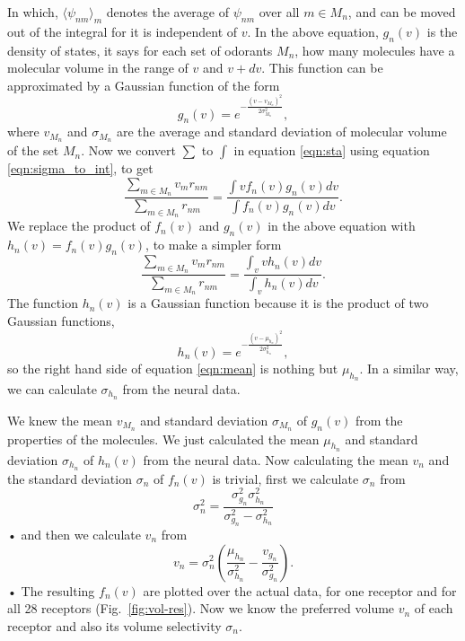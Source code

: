 \documentclass[11pt]{paper} %
\begin{document}
In which, 
$\langle \psi_{nm} \rangle_m$ denotes the average of $\psi_{nm}$ over all $m \in M_n$, 
and can be moved out of the integral for it is independent of $v$.
In the above equation, 
$g_n(v)$ is the density of states, it says for each set of odorants $M_n$, how many molecules have a molecular volume in the range of $v$ and $v+dv$.
This function can be approximated by a Gaussian function of the form 
\begin{equation}
	g_n(v) = e^{-\frac{(v- v_{M_n})^2}{2\sigma_{M_n}^2}},
\end{equation}
where $v_{M_n}$ and $\sigma_{M_n}$ are the average and standard deviation of molecular volume of the set $M_n$.
Now we convert $\sum$ to $\int$ in equation \ref{eqn:sta} using equation \ref{eqn:sigma_to_int}, to get
\begin{equation}
	\frac{\displaystyle \sum_{m\in M_n} v_m r_{nm}}{\displaystyle \sum_{m\in M_n} r_{nm}} = \frac{\displaystyle \int v f_n(v) g_n(v) dv}{\displaystyle \int f_n(v) g_n(v) dv}.
	\label{eqn:sta_int}
\end{equation}
We replace the product of $f_n(v)$ and $g_n(v)$ in the above equation with $h_n(v) = f_n(v) g_n(v)$, to make a simpler form
\begin{equation}
	\frac{\displaystyle \sum_{m\in M_n} v_m r_{nm}}{\displaystyle \sum_{m\in M_n} r_{nm}} = \frac{\displaystyle \int_v v h_n(v) dv}{ \displaystyle \int_v  h_n(v) dv }.
	\label{eqn:mean}
\end{equation}
The function $h_n(v)$ is a Gaussian function because it is the product of two Gaussian functions, 
\begin{equation}
h_n(v) = e^{-\frac{(v-\mu_{h_n})^2}{2\sigma_{h_n}^2}}, 
\end{equation}
so the right hand side of equation \ref{eqn:mean} is nothing but $\mu_{h_n}$. 
In a similar way, we can calculate $\sigma_{h_n}$ from the neural data.

We knew the mean $v_{M_n}$ and standard deviation $\sigma_{M_n}$ of $g_n(v)$ from the properties of the molecules. 
We just calculated the mean $\mu_{h_n}$ and standard deviation $\sigma_{h_n}$ of $h_n(v)$ from the neural data.
Now calculating the mean $v_n$ and the standard deviation $\sigma_n$ of $f_n(v)$ is trivial,
first we calculate $\sigma_n$ from 
\begin{equation}
	\sigma_n^2 = \frac{\sigma^2_{g_n} \sigma^2_{h_n}}{\sigma^2_{g_n} - \sigma^2_{h_n}}
\end{equation}•
and then we calculate $v_n$ from 
\begin{equation}
	v_n =  \sigma_n^2 \left ( \frac{\mu_{h_n}}{\sigma^2_{h_n}} - \frac{v_{g_n}}{\sigma^2_{g_n}} \right ).
\end{equation}•
The resulting $f_n(v)$ are plotted over the actual data, for one receptor and for all 28 receptors (Fig.~\ref{fig:vol-res}).
Now we know the preferred volume $v_n$ of each receptor and also its volume selectivity $\sigma_n$.
\end{document}
